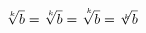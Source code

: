 \documentclass{book}
\begin{document}
$$\sqrt[k]{b}
=\sqrt[\leftroot{-1}\uproot{1}k]{b}
=\sqrt[\leftroot{-2}\uproot{4}k]{b}
=\sqrt[\leftroot{-2}\uproot{-4}k]{b}$$
\end{document}
